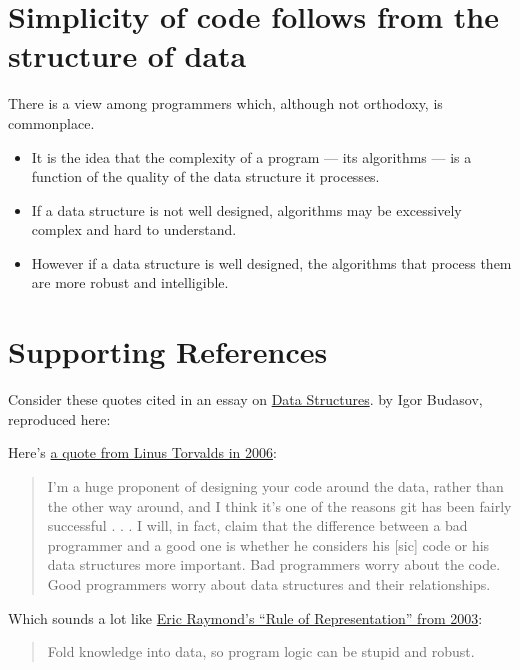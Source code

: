 \documentclass[
  letterpaper,
  DIV=11,
  numbers=noendperiod]{scrreprt}
\providecommand{\tightlist}{%
  \setlength{\itemsep}{0pt}\setlength{\parskip}{0pt}}\usepackage{longtable,booktabs,array}
\begin{document}
\hypertarget{simplicity-of-code-follows-from-the-structure-of-data}{%
\section{Simplicity of code follows from the structure of
data}\label{simplicity-of-code-follows-from-the-structure-of-data}}

There is a view among programmers which, although not orthodoxy, is
commonplace.

\begin{itemize}
\tightlist
\item
  It is the idea that the complexity of a program --- its algorithms ---
  is a function of the quality of the data structure it processes.
\item
  If a data structure is not well designed, algorithms may be
  excessively complex and hard to understand.
\item
  However if a data structure is well designed, the algorithms that
  process them are more robust and intelligible.
\end{itemize}

\hypertarget{supporting-references}{%
\section{Supporting References}\label{supporting-references}}

Consider these quotes cited in an essay on
\href{https://medium.com/webdevops/data-structures-548cbea9c520}{Data
Structures}. by Igor Budasov, reproduced here:

Here's \href{https://lwn.net/Articles/193245/}{a quote from Linus
Torvalds in 2006}:

\begin{quote}
I'm a huge proponent of designing your code around the data, rather than
the other way around, and I think it's one of the reasons git has been
fairly successful . . . I will, in fact, claim that the difference
between a bad programmer and a good one is whether he considers his
{[}sic{]} code or his data structures more important. Bad programmers
worry about the code. Good programmers worry about data structures and
their relationships.
\end{quote}

Which sounds a lot like
\href{http://www.catb.org/~esr/writings/taoup/html/ch01s06.html}{Eric
Raymond's ``Rule of Representation'' from 2003}:

\begin{quote}
Fold knowledge into data, so program logic can be stupid and robust.
\end{quote}
\end{document}
